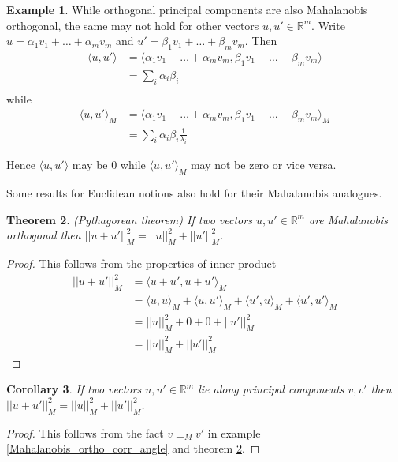 \documentclass[11pt]{amsart}
\newtheorem{theorem}{Theorem}[section]
\newtheorem{corollary}[theorem]{Corollary}
\theoremstyle{definition}
\newtheorem{example}[theorem]{Example}
\begin{document}
\begin{example} While orthogonal principal components are also Mahalanobis orthogonal, the same may not hold for other vectors $u, u' \in \mathbb{R}^m$. Write $u = \alpha_1 v_1 + \dots + \alpha_m v_m$ and $u' = \beta_1 v_1 + \dots + \beta_m v_m$. Then
\begin{align*}
\langle u, u' \rangle & = \langle \alpha_1 v_1 + \dots + \alpha_m v_m, \beta_1 v_1 + \dots + \beta_m v_m \rangle \\
 & = \sum\limits_i \alpha_i \beta_i \\
\end{align*}
while
\begin{align*}
\langle u, u' \rangle_M & = \langle \alpha_1 v_1 + \dots + \alpha_m v_m, \beta_1 v_1 + \dots + \beta_m v_m \rangle_M \\
 & = \sum\limits_i \alpha_i \beta_i \frac{1}{\lambda_i}
\end{align*}

Hence $\langle u, u' \rangle$ may be 0 while $\langle u, u' \rangle_M$ may not be zero or vice versa.
\end{example}

Some results for Euclidean notions also hold for their Mahalanobis analogues.

\begin{theorem} \label{Pythagorean_theorem} (Pythagorean theorem) If two vectors $u, u' \in \mathbb{R}^m$ are Mahalanobis orthogonal then $||u + u'||_M^2 = ||u||_M^2 + ||u'||_M^2$.
\end{theorem}
\begin{proof} This follows from the properties of inner product
\begin{align*}
||u + u'||_M^2 & = \langle u + u', u + u' \rangle_M \\
 & = \langle u, u \rangle_M + \langle u, u' \rangle_M + \langle u', u \rangle_M + \langle u', u' \rangle_M \\
 & = ||u||_M^2 + 0 + 0 + ||u'||_M^2 \\
 & = ||u||_M^2 + ||u'||_M^2
\end{align*}
\end{proof}

\begin{corollary} \label{Pythagorean_theorem_along_pc} If two vectors $u, u' \in \mathbb{R}^m$ lie along principal components $v, v'$ then $||u + u'||_M^2 = ||u||_M^2 + ||u'||_M^2$.
\end{corollary}
\begin{proof} This follows from the fact $v \perp_M v'$ in example \ref{Mahalanobis_ortho_corr_angle} and theorem \ref{Pythagorean_theorem}.
\end{proof}
\end{document}
